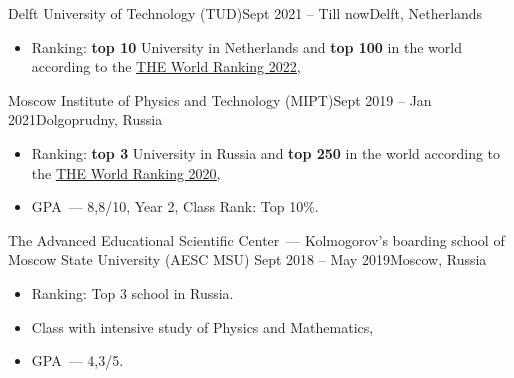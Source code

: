 
{Delft University of Technology (TUD)}{Sept 2021 -- Till now}{Delft, Netherlands}
\begin{itemize}
    \item Ranking: \textbf{top 10} University in Netherlands and \textbf{top 100} in the world according to the
    \href{https://www.timeshighereducation.com/world-university-rankings/2022/world-ranking}
    {\underline{THE World Ranking 2022}},
\end{itemize}
\divider

{Moscow Institute of Physics and Technology (MIPT)}{Sept 2019 -- Jan 2021}{Dolgoprudny, Russia}
\begin{itemize}
    \item Ranking: \textbf{top 3} University in Russia and \textbf{top 250} in the world according to the
    \href{https://www.timeshighereducation.com/world-university-rankings/2020/world-ranking#!/page/0/length/25/sort_by/rank/sort_order/asc/cols/stats}
    {\underline{THE World Ranking 2020}},
    \item GPA~--- 8,8/10, Year 2, Class Rank: Top 10\%.
\end{itemize}
\divider


{The Advanced Educational Scientific Center~--- Kolmogorov’s boarding school of Moscow State University (AESC MSU)}
{Sept 2018 -- May 2019}{Moscow, Russia}
\begin{itemize}
    \item Ranking: Top 3 school in Russia.
\end{itemize}


\begin{itemize}
    \item Class with intensive study of Physics and Mathematics,
    \item GPA~--- 4,3/5.
\end{itemize}


